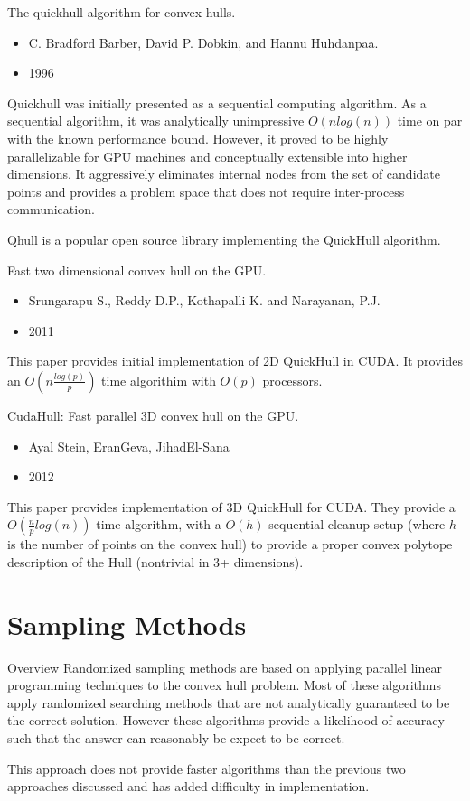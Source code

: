 \documentclass[11pt]{beamer}
\begin{document}
\begin{frame}{The quickhull algorithm for convex hulls.}

\begin{itemize}
\item{C. Bradford Barber, David P. Dobkin, and Hannu Huhdanpaa. }
\item{1996}
\end{itemize}
Quickhull was initially presented as a sequential computing algorithm. As a sequential algorithm, it was analytically unimpressive $O(nlog(n))$ time on par with the known performance bound. However, it proved to be highly parallelizable for GPU machines and conceptually extensible into higher dimensions. It aggressively eliminates internal nodes from the set of candidate points and provides a problem space that does not require inter-process communication.

Qhull is a popular open source library implementing the QuickHull algorithm.
\end{frame}




\begin{frame}{Fast two dimensional convex hull on the GPU.}
\begin{itemize}
\item{Srungarapu S., Reddy D.P., Kothapalli K. and Narayanan, P.J.}
\item{2011}
\end{itemize}
This paper provides initial implementation of 2D QuickHull in CUDA. It provides an $O(n\frac{log(p)}{p})$ time algorithim with $O(p)$ processors.
\end{frame}


\begin{frame}{CudaHull: Fast parallel 3D convex hull on the GPU.}
\begin{itemize}
\item{Ayal Stein, EranGeva, JihadEl-Sana}
\item{2012}
\end{itemize}
This paper provides implementation of 3D QuickHull for CUDA. They provide a $O(\frac{n}{p}log(n))$ time algorithm, with a $O(h)$ sequential cleanup setup (where $h$ is the number of points on the convex hull) to provide a proper convex polytope description of the Hull (nontrivial in 3+ dimensions). 
\end{frame}

\section{Sampling Methods}
\begin{frame}{Overview}
Randomized sampling methods are based on applying parallel linear programming techniques to the convex hull problem. Most of these algorithms apply randomized searching methods that are not analytically guaranteed to be the correct solution. However these algorithms provide a likelihood of accuracy such that the answer can reasonably be expect to be correct.

This approach does not provide faster algorithms than the previous two approaches discussed and has added difficulty in implementation.

\end{frame}
\end{document}
